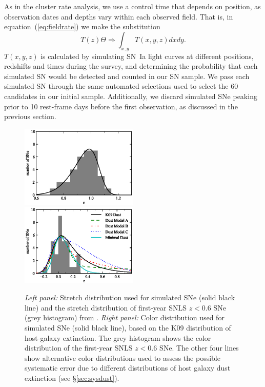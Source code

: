 
As in the cluster rate analysis, we use a control time that depends on
position, as observation dates and depths vary within each observed
field. That is, in equation~(\ref{eq:fieldrate}) we make the
substitution
\begin{equation}
T(z) \Theta \Rightarrow \int_{x,y} T (x,y,z) dx dy.
\end{equation}
$T(x,y,z)$ is calculated by simulating SN~Ia light curves at different
positions, redshifts and times during the survey, and determining the
probability that each simulated SN would be detected and counted in
our SN sample. We pass each simulated SN through the same automated
selections used to select the 60 candidates in our initial
sample. Additionally, we discard simulated SNe peaking prior to 10
rest-frame days before the first observation, as discussed in the
previous section.


\begin{figure}
\begin{center}
\includegraphics[width=0.5\textwidth]{figures/fieldrate/dist_field_s.eps}%
\includegraphics[width=0.5\textwidth]{figures/fieldrate/dist_field_c.eps}
\end{center}
\caption[Stretch and color distributions of simulated SNe (field rate)]{\emph{Left panel:} Stretch distribution used for
  simulated SNe (solid black line) and the stretch distribution
  of first-year SNLS $z<0.6$ SNe (grey histogram) from
  \citet{astier06a}.  \emph{Right panel:} Color distribution used for
  simulated SNe (solid black line), based on the K09
  distribution of host-galaxy extinction.  The grey histogram shows
  the color distribution of the first-year SNLS $z<0.6$ SNe. The other
  four lines show alternative color distributions used to assess the
  possible systematic error due to different distributions of host
  galaxy dust extinction (see \S\ref{sec:sysdust}).
\label{fig:dists_field}}
\end{figure}


